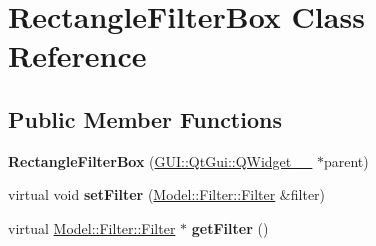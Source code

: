 \hypertarget{classGUI_1_1RectangleFilterBox}{}\section{Rectangle\+Filter\+Box Class Reference}
\label{classGUI_1_1RectangleFilterBox}
\subsection*{Public Member Functions}
\begin{DoxyCompactItemize}
\item 
\hypertarget{classGUI_1_1RectangleFilterBox_a2304c04792567122b3264c5c098ac876}{}{\bfseries Rectangle\+Filter\+Box} (\hyperlink{classGUI_1_1QtGui_1_1QWidget____10}{G\+U\+I\+::\+Qt\+Gui\+::\+Q\+Widget\+\_\+\+\_} $\ast$parent)\label{classGUI_1_1RectangleFilterBox_a2304c04792567122b3264c5c098ac876}

\item 
\hypertarget{classGUI_1_1RectangleFilterBox_ad7c0ee00fe3faac7942d75eec2a5342b}{}virtual void {\bfseries set\+Filter} (\hyperlink{classModel_1_1Filter_1_1Filter}{Model\+::\+Filter\+::\+Filter} \&filter)\label{classGUI_1_1RectangleFilterBox_ad7c0ee00fe3faac7942d75eec2a5342b}

\item 
\hypertarget{classGUI_1_1RectangleFilterBox_acef2029a93f4ab3a538cdb643b9c2613}{}virtual \hyperlink{classModel_1_1Filter_1_1Filter}{Model\+::\+Filter\+::\+Filter} $\ast$ {\bfseries get\+Filter} ()\label{classGUI_1_1RectangleFilterBox_acef2029a93f4ab3a538cdb643b9c2613}

\end{DoxyCompactItemize}
